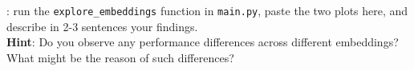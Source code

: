     \noindent \todo{}: run the \texttt{explore\_embeddings} function in \texttt{main.py}, paste the two plots here, and describe in 2-3 sentences your findings.\\
    \noindent \textbf{Hint}: Do you observe any performance differences across different embeddings? What might be the reason of such differences? 
    \\\\
    \noindent {\color{red}{your plot and answer:}}\\

    \noindent\solution{}

    \newpage
    
    

